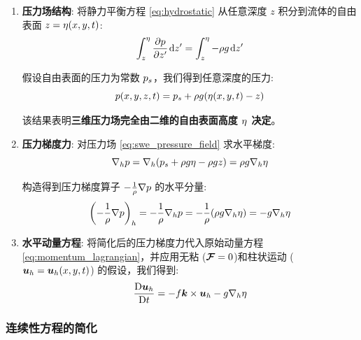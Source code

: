 \begin{enumerate}
    \item \textbf{压力场结构}:
    将静力平衡方程 \eqref{eq:hydrostatic} 从任意深度 $z$ 积分到流体的自由表面 $z= \eta(x, y, t)$:
    \begin{equation*}
        \int_z^\freeheight \pde{\pressure}{z^\prime} \dd{z^\prime} = \int_z^\freeheight -\density \gravityconst \dd{z^\prime}
    \end{equation*}

    假设自由表面的压力为常数 $p_s$，我们得到任意深度的压力:
    \begin{equation}
        p(x, y, z, t) = p_s + \rho g (\eta(x, y, t) - z)
        \label{eq:swe_pressure_field}
    \end{equation}

    该结果表明\textbf{三维压力场完全由二维的自由表面高度 $\eta$ 决定}。

    \item \textbf{压力梯度力}:
对压力场 \eqref{eq:swe_pressure_field} 求水平梯度:
    \begin{equation*}
        \nabla_h p = \nabla_h (p_s + \rho g \eta - \rho g z) = \rho g \nabla_h \eta
    \end{equation*}

    构造得到压力梯度算子 $-\frac{1}{\rho} \nabla p$ 的水平分量:
    \begin{equation*}
        \left(-\frac{1}{\rho} \nabla p\right)_h = -\frac{1}{\rho}\nabla_h p = -\frac{1}{\rho}(\rho g \nabla_h \eta) = -g \nabla_h \eta
    \end{equation*}

    \item \textbf{水平动量方程}:
    将简化后的压力梯度力代入原始动量方程 \eqref{eq:momentum_lagrangian}，并应用无粘 ($\bm{\mathcal{F}} = 0$)和柱状运动 ($\bm{u}_h = \bm{u}_h(x, y, t)$) 的假设，我们得到:
    \begin{equation}
        \frac{\mathrm{D} \bm{u}_h}{\mathrm{D} t} = -f \bm{k} \times \bm{u}_h - g \nabla_h \eta
        \label{eq:momentum_shallow}
    \end{equation}
\end{enumerate}

\subsubsection{连续性方程的简化}

